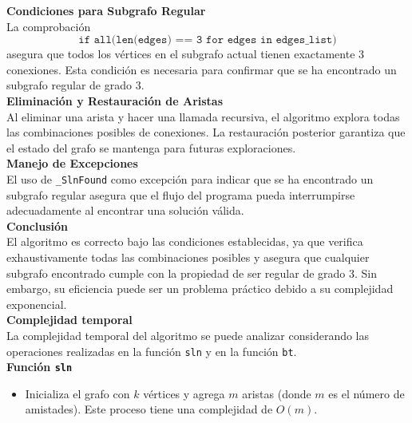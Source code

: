 \documentclass[
10pt, %
a4paper, %
oneside, %
headinclude,footinclude, %
BCOR5mm, %
]{scrartcl}
\begin{document}
\textbf{Condiciones para Subgrafo Regular}\\

La comprobación 
\[
\texttt{if all(len(edges) == 3 for edges in edges\_list)}
\]
asegura que todos los vértices en el subgrafo actual tienen exactamente 3 conexiones. Esta condición es necesaria para confirmar que se ha encontrado un subgrafo regular de grado 3.\\

\textbf{Eliminación y Restauración de Aristas} \\

Al eliminar una arista y hacer una llamada recursiva, el algoritmo explora todas las combinaciones posibles de conexiones. La restauración posterior garantiza que el estado del grafo se mantenga para futuras exploraciones.\\

\textbf{Manejo de Excepciones}\\

El uso de \texttt{\_SlnFound} como excepción para indicar que se ha encontrado un subgrafo regular asegura que el flujo del programa pueda interrumpirse adecuadamente al encontrar una solución válida.\\


\textbf{Conclusión}\\

El algoritmo es correcto bajo las condiciones establecidas, ya que verifica exhaustivamente todas las combinaciones posibles y asegura que cualquier subgrafo encontrado cumple con la propiedad de ser regular de grado 3. Sin embargo, su eficiencia puede ser un problema práctico debido a su complejidad exponencial.\\



\textbf{Complejidad temporal}\\


La complejidad temporal del algoritmo se puede analizar considerando las operaciones realizadas en la función \texttt{sln} y en la función \texttt{bt}.\\


\textbf{Función \texttt{sln} }\\

\begin{itemize}
    \item Inicializa el grafo con \( k \) vértices y agrega \( m \) aristas (donde \( m \) es el número de amistades). Este proceso tiene una complejidad de \( O(m) \).\\
\end{itemize}
\end{document}

